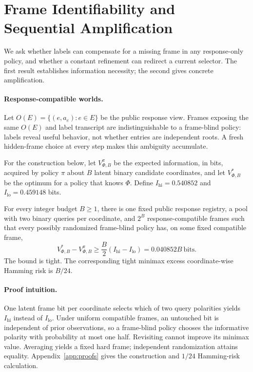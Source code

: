 \section{Frame Identifiability and Sequential Amplification}
\label{sec:theory}

We ask whether labels can compensate for a missing frame in any response-only policy, and whether a constant refinement can redirect a current selector. The first result establishes information necessity; the second gives concrete amplification.

\paragraph{Response-compatible worlds.}
Let $O(E)=\{(e,a_e):e\in E\}$ be the public response view. Frames exposing the same $O(E)$ and label transcript are indistinguishable to a frame-blind policy: labels reveal useful behavior, not whether entries are independent roots. A fresh hidden-frame choice at every step makes this ambiguity accumulate.

For the construction below, let $V^\pi_{\Phi,B}$ be the expected information, in bits, acquired by policy $\pi$ about $B$ latent binary candidate coordinates, and let $V^*_{\Phi,B}$ be the optimum for a policy that knows $\Phi$. Define $I_{\mathrm{hi}}=0.540852$ and $I_{\mathrm{lo}}=0.459148$ bits.

\begin{theorem}
\label{thm:sequential}
For every integer budget $B\geq1$, there is one fixed public response registry, a pool with two binary queries per coordinate, and $2^B$ response-compatible frames such that every possibly randomized frame-blind policy has, on some fixed compatible frame,
\[
V^*_{\Phi,B}-V^\pi_{\Phi,B}
\geq \frac{B}{2}(I_{\mathrm{hi}}-I_{\mathrm{lo}})
=0.040852B\ \text{bits}.
\]
The bound is tight. The corresponding tight minimax excess coordinate-wise Hamming risk is $B/24$.
\end{theorem}

\paragraph{Proof intuition.}
One latent frame bit per coordinate selects which of two query polarities yields $I_{\mathrm{hi}}$ instead of $I_{\mathrm{lo}}$. Under uniform compatible frames, an untouched bit is independent of prior observations, so a frame-blind policy chooses the informative polarity with probability at most one half. Revisiting cannot improve its minimax value. Averaging yields a fixed hard frame; independent randomization attains equality. Appendix~\ref{app:proofs} gives the construction and $1/24$ Hamming-risk calculation.

